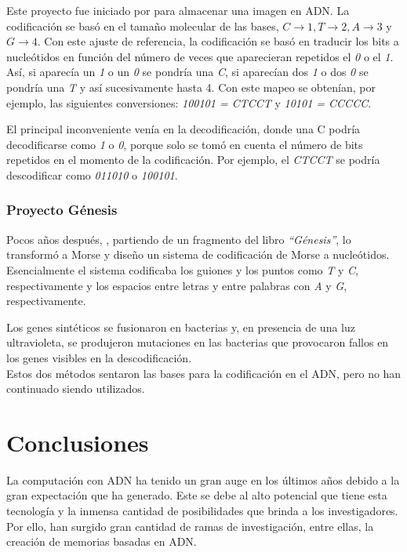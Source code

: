 \documentclass[a4paper,11pt]{article}
\begin{document}
Este proyecto fue iniciado por \citep{JoeDavis1996} para almacenar una imagen en ADN. La codificación se basó en el tamaño molecular de las bases, \(C \rightarrow 1, T \rightarrow 2, A \rightarrow 3\) y \(G \rightarrow 4\). Con este ajuste de referencia, la codificación se basó en traducir los bits a nucleótidos en función del número de veces que aparecieran repetidos el \textit{0} o el \textit{1}. Así, si aparecía un \textit{1} o un \textit{0} se pondría una \textit{C}, si aparecían dos \textit{1} o dos \textit{0} se pondría una \textit{T} y así sucesivamente hasta 4. Con este mapeo se obtenían, por ejemplo, las siguientes conversiones: \textit{100101 = CTCCT} y \textit{10101 = CCCCC}. 

El principal inconveniente venía en la decodificación, donde una C podría decodificarse como \textit{1} o \textit{0}, porque solo se tomó en cuenta el número de bits repetidos en el momento de la codificación. Por ejemplo, el \textit{CTCCT} se podría descodificar como \textit{011010} o \textit{100101}. 

\subsubsection{Proyecto Génesis}

 Pocos años después, \citep{EK1999}, partiendo de un fragmento del libro \textit{ “Génesis”}, lo transformó a Morse y diseño un sistema de codificación de Morse a nucleótidos. Esencialmente el sistema codificaba los guiones y los puntos como \textit{T} y \textit{C}, respectivamente y los espacios entre letras y entre palabras con \textit{A} y \textit{G}, respectivamente.
 
Los genes sintéticos se fusionaron en bacterias y, en presencia de una luz ultravioleta, se produjeron mutaciones en las bacterias que provocaron fallos en los genes visibles en la descodificación.\\

Estos dos métodos sentaron las bases para la codificación en el ADN, pero no han continuado siendo utilizados.

\section{Conclusiones}

La computación con ADN ha tenido un gran auge en los últimos años debido a la gran expectación que ha generado. Este se debe al alto potencial que tiene esta tecnología y la inmensa cantidad de posibilidades que brinda a los investigadores. Por ello, han surgido gran cantidad de ramas de investigación, entre ellas, la creación de memorias basadas en ADN.
\end{document}
